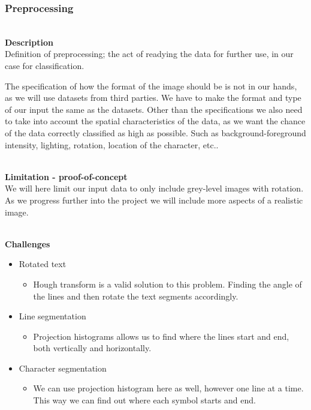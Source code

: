 \documentclass[11pt,a4paper,UKenglish]{article}
\begin{document}
\subsubsection{Preprocessing}
\noindent \\ \textbf{Description}
\noindent \\ Definition of preprocessing; the act of readying the data for
further use, in our case for classification. \par
The specification of how the format of the image should be is not in our hands,
as we will use datasets from third parties. We have to make the format and
type of our input the same as the datasets. Other than the specifications we
also need to take into account the spatial characteristics of the data, as we
want the chance of the data correctly classified as high as possible. Such as
background-foreground intensity, lighting, rotation, location of the
character, etc.. \par

\noindent \\ \textbf{Limitation - proof-of-concept}
\noindent \\ We will here limit our input data to only include grey-level
images with rotation. As we progress further into the project we will include
more aspects of a realistic image.

\noindent \\ \textbf{Challenges}
\begin{itemize}
 \item{Rotated text}
 \begin{itemize}
  \item{Hough transform is a valid solution to this problem. Finding the angle
  of the lines and then rotate the text segments accordingly.}
 \end{itemize}
 \item{Line segmentation}
 \begin{itemize}
  \item{Projection histograms allows us to find where the lines start and end,
  both vertically and horizontally.}
 \end{itemize}
 \item{Character segmentation}
 \begin{itemize}
  \item{We can use projection histogram here as well, however one line at a
  time. This way we can find out where each symbol starts and end.}
 \end{itemize}
\end{itemize}
\end{document}
